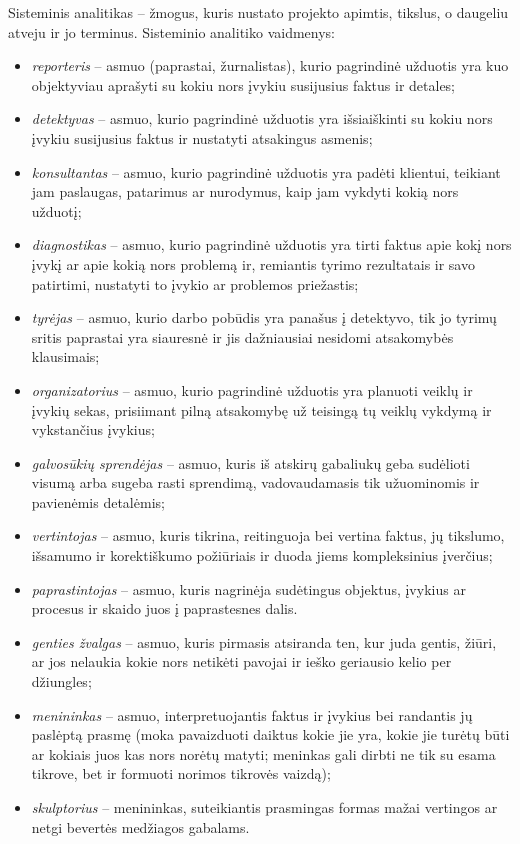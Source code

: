 Sisteminis analitikas – žmogus, kuris nustato projekto apimtis, tikslus,
o daugeliu atveju ir jo terminus. Sisteminio analitiko vaidmenys:
\begin{itemize}
  \item \emph{reporteris} – asmuo (paprastai, žurnalistas), kurio 
    pagrindinė užduotis yra kuo objektyviau aprašyti su kokiu nors įvykiu
    susijusius faktus ir detales;
  \item \emph{detektyvas} – asmuo, kurio pagrindinė užduotis yra 
    išsiaiškinti su kokiu nors įvykiu susijusius faktus ir nustatyti
    atsakingus asmenis;
  \item \emph{konsultantas} – asmuo, kurio pagrindinė užduotis yra padėti
    klientui, teikiant jam paslaugas, patarimus ar nurodymus, kaip
    jam vykdyti kokią nors užduotį;
  \item \emph{diagnostikas} – asmuo, kurio pagrindinė užduotis yra tirti
    faktus apie kokį nors įvykį ar apie kokią nors problemą ir,
    remiantis tyrimo rezultatais ir savo patirtimi, nustatyti to
    įvykio ar problemos priežastis;
  \item \emph{tyrėjas} – asmuo, kurio darbo pobūdis yra panašus į 
    detektyvo, tik jo tyrimų sritis paprastai yra siauresnė ir jis
    dažniausiai nesidomi atsakomybės klausimais;
  \item \emph{organizatorius} – asmuo, kurio pagrindinė užduotis yra 
    planuoti veiklų ir įvykių sekas, prisiimant pilną atsakomybę už
    teisingą tų veiklų vykdymą ir vykstančius įvykius;
  \item \emph{galvosūkių sprendėjas} – asmuo, kuris iš atskirų gabaliukų
    geba sudėlioti visumą arba sugeba rasti sprendimą, vadovaudamasis
    tik užuominomis ir pavienėmis detalėmis;
  \item \emph{vertintojas} – asmuo, kuris tikrina, reitinguoja bei 
    vertina faktus, jų tikslumo, išsamumo ir korektiškumo požiūriais ir
    duoda jiems kompleksinius įverčius;
  \item \emph{paprastintojas} – asmuo, kuris nagrinėja sudėtingus
    objektus, įvykius ar procesus ir skaido juos į paprastesnes dalis.
  \item \emph{genties žvalgas} – asmuo, kuris pirmasis atsiranda ten,
    kur juda gentis, žiūri, ar jos nelaukia kokie nors netikėti pavojai
    ir ieško geriausio kelio per džiungles;
  \item \emph{menininkas} – asmuo, interpretuojantis faktus ir įvykius
    bei randantis jų paslėptą prasmę (moka pavaizduoti daiktus kokie
    jie yra, kokie jie turėtų būti ar kokiais juos kas nors norėtų
    matyti; meninkas gali dirbti ne tik su esama tikrove, bet ir formuoti
    norimos tikrovės vaizdą);
  \item \emph{skulptorius} – menininkas, suteikiantis prasmingas formas
    mažai vertingos ar netgi bevertės medžiagos gabalams.
\end{itemize}

